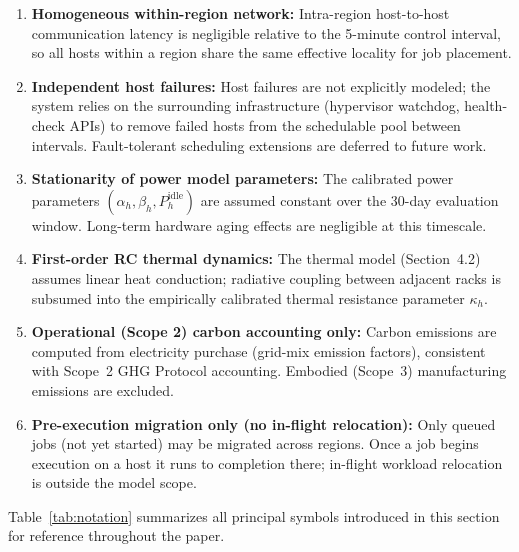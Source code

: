 \documentclass[a4paper,fleqn]{cas-dc}
\begin{document}
\begin{enumerate}
  \item \textbf{Homogeneous within-region network:} Intra-region host-to-host communication latency is negligible relative to the 5-minute control interval, so all hosts within a region share the same effective locality for job placement.
  \item \textbf{Independent host failures:} Host failures are not explicitly modeled; the system relies on the surrounding infrastructure (hypervisor watchdog, health-check APIs) to remove failed hosts from the schedulable pool between intervals. Fault-tolerant scheduling extensions are deferred to future work.
  \item \textbf{Stationarity of power model parameters:} The calibrated power parameters $(\alpha_h, \beta_h, P^{\mathrm{idle}}_h)$ are assumed constant over the 30-day evaluation window. Long-term hardware aging effects are negligible at this timescale.
  \item \textbf{First-order RC thermal dynamics:} The thermal model (Section~4.2) assumes linear heat conduction; radiative coupling between adjacent racks is subsumed into the empirically calibrated thermal resistance parameter $\kappa_h$.
  \item \textbf{Operational (Scope 2) carbon accounting only:} Carbon emissions are computed from electricity purchase (grid-mix emission factors), consistent with Scope~2 GHG Protocol accounting. Embodied (Scope~3) manufacturing emissions are excluded.
  \item \textbf{Pre-execution migration only (no in-flight relocation):} Only queued jobs (not yet started) may be migrated across regions. Once a job begins execution on a host it runs to completion there; in-flight workload relocation is outside the model scope.
\end{enumerate}

Table~\ref{tab:notation} summarizes all principal symbols introduced in this section for reference throughout the paper.
\end{document}
